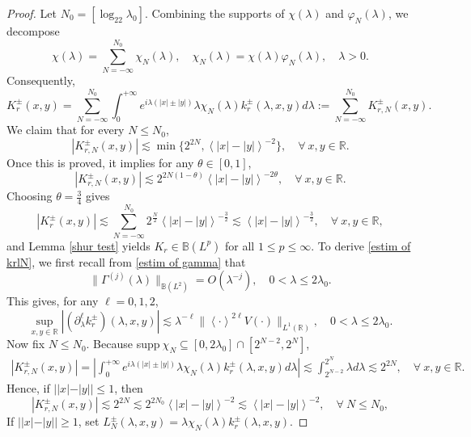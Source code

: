 \documentclass[10pt,a4paper]{amsart}
\newcommand\B{\mathbb{B}}
\newcommand\R{\mathbb{R}}
\begin{document}
\begin{proof}
Let $N_0=[\log_22\lambda_0]$. Combining the supports of $\chi(\lambda)$ and $\varphi_N(\lambda)$, we decompose
\begin{equation*}
\chi(\lambda)=\sum_{N=-\infty}^{N_0}{\chi}_{N}(\lambda),\quad {\chi}_{N}(\lambda)=\chi(\lambda)\varphi_{N}(\lambda),\quad\lambda>0.
\end{equation*}
Consequently,
\begin{equation*}
K^{\pm}_{r}(x,y)=\sum_{N=-\infty}^{N_0}\int_{0}^{+\infty}e^{i\lambda(|x|\pm |y|)}\lambda{\chi}_{N}(\lambda)k^{\pm}_r(\lambda,x,y)d\lambda:=\sum_{N=-\infty}^{N_0}K^{\pm}_{r,N}(x,y).
\end{equation*}
We claim that for every  $N\leq N_0$,
\begin{equation}\label{estim of krlN}
|K^{\pm}_{r,N}(x,y)|\lesssim \min\{{2^{2N},\left<|x|-|y|\right>^{-2}}\},\quad \forall\ x,y\in\R.
\end{equation}
Once this is proved, it implies for any $\theta\in[0,1]$, 
 $$|K^{\pm}_{r,N}(x,y)|\lesssim2^{2N(1-\theta)}\left<|x|-|y|\right>^{-2\theta},\quad \forall\ x,y\in\R.$$
Choosing $\theta=\frac{3}{4}$ gives
$$|K^{\pm}_{r}(x,y)|\lesssim\sum_{N=-\infty}^{N_0}2^{\frac{N}{2}}\left<|x|-|y|\right>^{-\frac{3}{2}}\lesssim\left<|x|-|y|\right>^{-\frac{3}{2}},\quad \forall\ x,y\in\R,$$
and Lemma \ref{shur test} yields $K_r\in\B(L^p)$ for all $1\leq p\leq\infty$. To derive \eqref{estim of krlN}, we first recall from \eqref{estim of gamma} that
$$\|\Gamma^{(j)}(\lambda)\|_{\B(L^2)}=O(\lambda^{-j}),\quad 0<\lambda\leq2\lambda_0.$$
This gives, for any $\ell=0,1,2$,
\begin{equation}\label{estim of krN}
\sup_{x,y\in\R}\left|(\partial^{\ell}_{\lambda}k^{\pm}_r)(\lambda,x,y)\right|\lesssim\lambda^{-\ell}\big\|\left<\cdot\right>^{2\ell}V(\cdot)\big\|_{L^1(\R)},\quad  0<\lambda\leq2\lambda_0.
\end{equation}
Now fix $ N\leq N_0$. Because supp$\ \chi_N\subseteq [0,2\lambda_0]\cap[2^{N-2},2^N]$, 
\begin{align}\label{klbn}
|K^{\pm}_{r,N}(x,y)|=\left|\int_{0}^{+\infty}e^{i\lambda(|x|\pm |y|)}\lambda{\chi}_{N}(\lambda)k^{\pm}_r(\lambda,x,y)d\lambda\right|\lesssim\int_{2^{N-2}}^{2^{N}}\lambda d\lambda\lesssim2^{2N},\quad \forall \ x,y\in\R.
\end{align}
Hence, if $||x|-|y||\leq1$, then
$$|K^{\pm}_{r,N}(x,y)|\lesssim2^{2N}\lesssim2^{2N_0} \left<|x|-|y|\right>^{-2}\lesssim \left<|x|-|y|\right>^{-2},\quad \forall\ N\leq N_0 ,$$
If $||x|-|y||\geq1$, set $L^{\pm}_{N}(\lambda,x,y)=\lambda{\chi}_{N}(\lambda)k^{\pm}_r(\lambda,x,y)$.

\end{proof}
\end{document}
